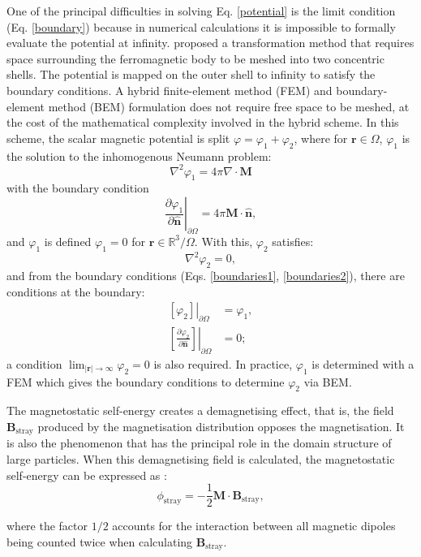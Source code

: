 One of the principal difficulties in solving Eq. \ref{potential} is the limit condition (Eq. \ref{boundary}) because in numerical calculations it is impossible to formally evaluate the potential at infinity. \citet{Imhoff1990} proposed a transformation method that requires space surrounding the ferromagnetic body to be meshed into two concentric shells. The potential is mapped on the outer shell to infinity to satisfy the boundary conditions. A hybrid finite-element method (FEM) and boundary-element method (BEM) formulation \citep{Fredkin1990} does not require free space to be meshed, at the cost of the mathematical complexity involved in the hybrid scheme. In this scheme, the scalar magnetic potential is split $\varphi = \varphi_1 + \varphi_2$, where for $\boldsymbol{r} \in \Omega$, $\varphi_1$ is the solution to the inhomogenous Neumann problem:
\begin{equation}
\nabla^2 \varphi_1 = 4 \pi \nabla \cdot \boldsymbol{M}
\end{equation}
with the boundary condition
\begin{equation}
\left. \frac{\partial \varphi_1}{\partial \boldsymbol{\hat{n}}} \right|_{\partial \Omega} = 4 \pi \boldsymbol{M} \cdot \boldsymbol{\hat{n}},
\end{equation}
and $\varphi_1$ is defined $\varphi_1 = 0$ for $\boldsymbol{r} \in \mathbb{R}^3 / \Omega$. With this, $\varphi_2$ satisfies:
\begin{equation}
\nabla^2 \varphi_2 = 0,
\end{equation}
and from the boundary conditions (Eqs. \ref{boundaries1}, \ref{boundaries2}), there are conditions at the boundary:
\begin{align}
\left. \left[  \varphi_2 \right] \right|_{\partial\Omega} &= \varphi_1, \\
\left. \left[  \frac{\partial\varphi_2}{\partial\boldsymbol{\hat{n}}} \right] \right|_{\partial\Omega} &= 0;
\end{align}
a condition $\lim_{|\boldsymbol{r}| \to \infty} \varphi_2 = 0$ is also required. In practice, $\varphi_1$ is determined with a FEM which gives the boundary conditions to determine $\varphi_2$ via BEM.\par

The magnetostatic self-energy creates a demagnetising effect, that is, the field $\boldsymbol{B}_{\text{stray}}$ produced by the magnetisation distribution opposes the magnetisation. It is also the phenomenon that has the principal role in the domain structure of large particles. When this demagnetising field is calculated, the magnetostatic self-energy can be expressed as \citep{Brown}:
\begin{equation}
\phi_{\text{stray}} = -\frac{1}{2}\boldsymbol{M}\cdot\boldsymbol{B}_{\text{stray}},
\end{equation}\par
where the factor $1/2$ accounts for the interaction between all magnetic dipoles being counted twice when calculating $\boldsymbol{B}_\text{stray}$.\par

